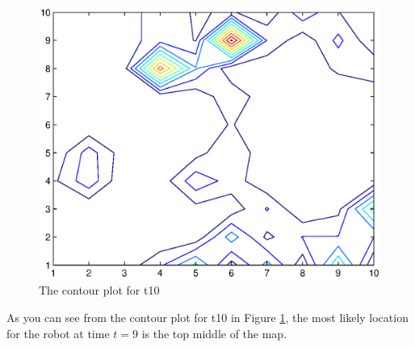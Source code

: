 \documentclass[11pt,a4paper]{article}
\begin{document}
\begin{enumerate}
		\begin{figure}[h]
			\label{fig:contour10}
			\begin{center}
				\includegraphics[scale=0.75]{t10-contour.eps}
			\end{center}
			\caption{The contour plot for t10}
		\end{figure}
		As you can see from the contour plot for t10 in Figure \ref{fig:contour10}, the most
		likely location for the robot at time $t=9$ is the top middle of the map.
		

\end{enumerate}
\end{document}
